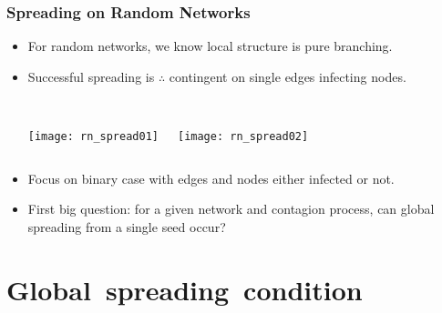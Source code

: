 \begin{frame}
  \frametitle{Spreading on Random Networks}

  \begin{itemize}
  \item<1-> 
    For random networks, we know local structure is pure branching.
  \item<2-> 
    Successful spreading is $\therefore$ contingent on 
    \alert{single edges} infecting nodes.
      \begin{columns}
        \begin{overprint}
          \\
          \texttt{[image: rn\_spread01]}
        \end{overprint}
        \begin{overprint}
          \\
          \texttt{[image: rn\_spread02]}
        \end{overprint}
      \end{columns}
  \item<4-> 
    Focus on \alert{binary} case with edges and nodes
    either infected or not.
  \item<5->
    \alert{First big question:} for a given network
    and contagion process, can global spreading from
    a single seed occur?
  \end{itemize}

\end{frame}

\section{Global\ spreading\ condition}


